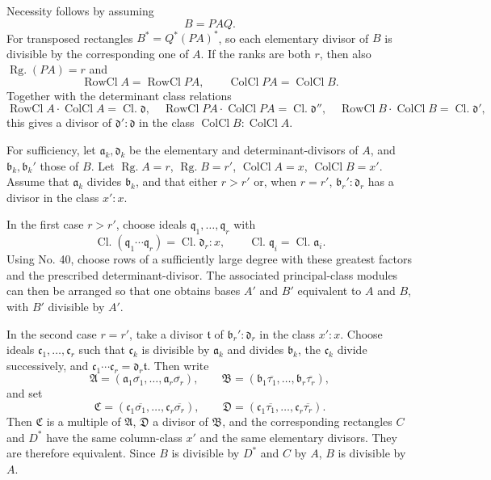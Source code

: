 \documentclass[11pt]{article}
\newcommand{\Rg}{\operatorname{Rg.}}
\newcommand{\Kl}{\operatorname{Cl.}}
\newcommand{\Zkl}{\operatorname{RowCl}}
\newcommand{\Kkl}{\operatorname{ColCl}}
\begin{document}
Necessity follows by assuming
\begin{equation}
B=PAQ.
\tag{82}
\end{equation}
For transposed rectangles $B^*=Q^*(PA)^*$, so each elementary divisor of $B$ is divisible by the corresponding one of $A$. If the ranks are both $r$, then also $\Rg(PA)=r$ and
\begin{equation}
\Zkl A=\Zkl PA,
\qquad
\Kkl PA=\Kkl B.
\tag{83}
\end{equation}
Together with the determinant class relations
\begin{equation}
\Zkl A\cdot\Kkl A=\Kl\mathfrak d,
\quad
\Zkl PA\cdot\Kkl PA=\Kl\mathfrak d'',
\quad
\Zkl B\cdot\Kkl B=\Kl\mathfrak d',
\tag{84}
\end{equation}
this gives a divisor of $\mathfrak d':\mathfrak d$ in the class $\Kkl B:\Kkl A$.

For sufficiency, let $\mathfrak a_k,
\mathfrak d_k$ be the elementary and determinant-divisors of $A$, and $\mathfrak b_k,
\mathfrak b_k'$ those of $B$. Let $\Rg A=r$, $\Rg B=r'$, $\Kkl A=x$, $\Kkl B=x'$. Assume that $\mathfrak a_k$ divides $\mathfrak b_k$, and that either $r>r'$ or, when $r=r'$, $\mathfrak b_r':\mathfrak d_r$ has a divisor in the class $x':x$.

In the first case $r>r'$, choose ideals $\mathfrak q_1,
\ldots,
\mathfrak q_r$ with
\begin{equation}
\Kl(\mathfrak q_1\cdots\mathfrak q_r)=\Kl\mathfrak d_r:x,
\qquad
\Kl\mathfrak q_i=\Kl\mathfrak a_i.
\tag{85}
\end{equation}
Using No. 40, choose rows of a sufficiently large degree with these greatest factors and the prescribed determinant-divisor. The associated principal-class modules can then be arranged so that one obtains bases $A'$ and $B'$ equivalent to $A$ and $B$, with $B'$ divisible by $A'$.

In the second case $r=r'$, take a divisor $\mathfrak t$ of $\mathfrak b_r':\mathfrak d_r$ in the class $x':x$. Choose ideals $\mathfrak c_1,
\ldots,
\mathfrak c_r$ such that $\mathfrak c_k$ is divisible by $\mathfrak a_k$ and divides $\mathfrak b_k$, the $\mathfrak c_k$ divide successively, and $\mathfrak c_1\cdots\mathfrak c_r=\mathfrak d_r\mathfrak t$. Then write
\[
\mathfrak A=(\mathfrak a_1\overline{\sigma_1},
\ldots,
\mathfrak a_r\overline{\sigma_r}),
\qquad
\mathfrak B=(\mathfrak b_1\overline{\tau_1},
\ldots,
\mathfrak b_r\overline{\tau_r}),
\]
and set
\[
\mathfrak C=(\mathfrak c_1\overline{\sigma_1},
\ldots,
\mathfrak c_r\overline{\sigma_r}),
\qquad
\mathfrak D=(\mathfrak c_1\overline{\tau_1},
\ldots,
\mathfrak c_r\overline{\tau_r}).
\]
Then $\mathfrak C$ is a multiple of $\mathfrak A$, $\mathfrak D$ a divisor of $\mathfrak B$, and the corresponding rectangles $C$ and $D^*$ have the same column-class $x'$ and the same elementary divisors. They are therefore equivalent. Since $B$ is divisible by $D^*$ and $C$ by $A$, $B$ is divisible by $A$.
\end{document}
